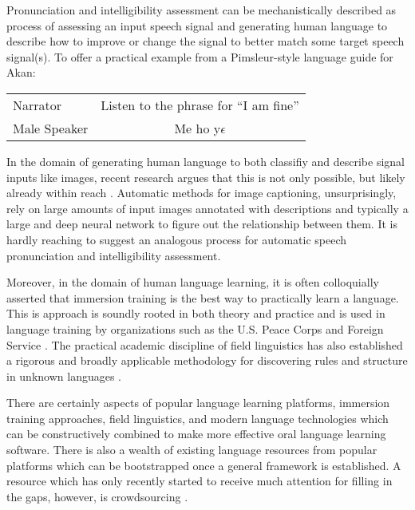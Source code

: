 Pronunciation and intelligibility assessment can be mechanistically described as process of assessing an input speech signal and generating human language to describe how to improve or change the signal to better match some target speech signal(s). To offer a practical example from a Pimsleur-style language guide for Akan:

\begin{center}
\begin{tabular}{ l | c }
  Narrator  & Listen to the phrase for ``I am fine'' \\
  Male Speaker & Me ho y$\epsilon$ 
  
\end{tabular}
\end{center}

In the domain of generating human language to both classifiy and describe signal inputs like images, recent research argues that this is not only possible, but likely already within reach \cite{reed2016learning} \cite{tran2016rich}. Automatic methods for image captioning, unsurprisingly, rely on large amounts of input images annotated with descriptions and typically a large and deep neural network to figure out the relationship between them. It is hardly reaching to suggest an analogous process for automatic speech pronunciation and intelligibility assessment. 

Moreover, in the domain of human language learning, it is often colloquially asserted that immersion training is the best way to practically learn a language. This is approach is soundly rooted in both theory and practice and is used in language training by organizations such as the U.S. Peace Corps and Foreign Service \cite{swain1998interaction} \cite{genesee1987learning} \cite{johnson1997immersion} \cite{howard2005second} \cite{leeds1990notes}. The practical academic discipline of field linguistics has also established a rigorous and broadly applicable methodology for discovering rules and structure in unknown languages \cite{seuren1966grammar} \cite{crowley2007field} \cite{lawler1998using}. 

There are certainly aspects of popular language learning platforms, immersion training approaches, field linguistics, and modern language technologies which can be constructively combined to make more effective oral language learning software. There is also a wealth of existing language resources from popular platforms which can be bootstrapped once a general framework is established. A resource which has only recently started to receive much attention for filling in the gaps, however, is crowdsourcing \cite{eskenazi2013crowdsourcing} \cite{parent2011speaking} \cite{callison2010creating}.

